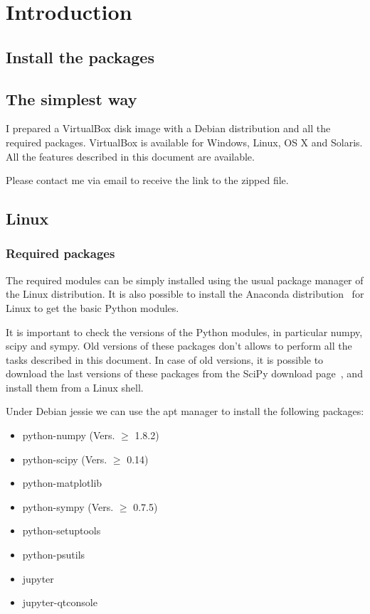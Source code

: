 \chapter{Introduction}

\section{Install the packages}

\section{The simplest way}
I prepared a VirtualBox disk image \cite{VIRTUALBOX} with a Debian distribution 
and all the required packages. VirtualBox is available for Windows, Linux, 
OS X and Solaris. All the features described in this document are available.

Please contact me via email to receive the link to the zipped file.

\section{Linux}

\subsection{Required packages}

The required modules can be simply installed using the usual package manager 
of the Linux distribution.
It is also possible to install the Anaconda distribution~\cite{ANACONDA} for 
Linux to get the basic Python modules.

It is important to check the versions of the Python modules, in particular 
numpy, scipy and sympy. Old versions of these packages don't allows to perform 
all the tasks described in this document.
In case of old versions, it is possible to download the last versions of these 
packages 
from the SciPy download page~\cite{SCIPYDOWNLOAD}, and install them from a 
Linux 
shell.

Under Debian jessie we can use the apt manager to install the 
following packages:
\begin{itemize}
\item python-numpy (Vers. $\geq$ 1.8.2)
\item python-scipy (Vers. $\geq$ 0.14)
\item python-matplotlib 
\item python-sympy (Vers. $\geq$ 0.7.5)
\item python-setuptools
\item python-psutils
\item jupyter
\item jupyter-qtconsole
\end{itemize}

